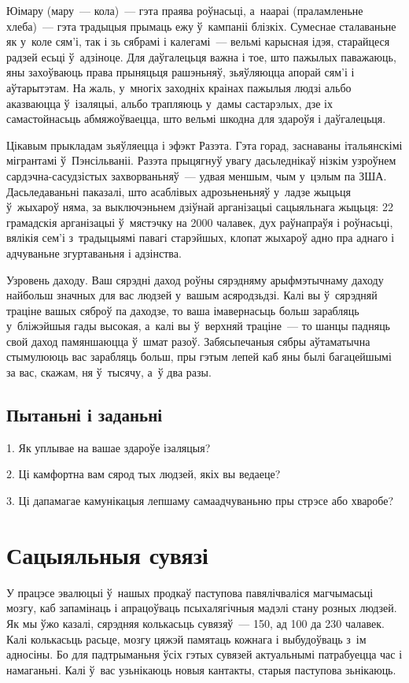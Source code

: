 Юімару (мару~--- кола)~--- гэта праява роўнасьці, а~наараі (праламленьне хлеба)~--- гэта традыцыя прымаць ежу ў~кампаніі блізкіх. Сумеснае сталаваньне як у~коле сям'і, так і зь сябрамі і калегамі~--- вельмі карысная ідэя, старайцеся радзей есьці ў~адзіноце. Для даўгалецьця важна і тое, што пажылых паважаюць, яны захоўваюць права прыняцьця рашэньняў, зьяўляюцца апорай сям'і і аўтарытэтам. На жаль, у~многіх заходніх краінах пажылыя людзі альбо аказваюцца ў~ізаляцыі, альбо трапляюць у~дамы састарэлых, дзе іх самастойнасьць абмяжоўваецца, што вельмі шкодна для здароўя і даўгалецьця.

Цікавым прыкладам зьяўляецца і эфэкт Разэта. Гэта горад, заснаваны італьянскімі мігрантамі ў~Пэнсільваніі. Разэта прыцягнуў увагу дасьледнікаў нізкім узроўнем сардэчна-сасудзістых захворваньняў~--- удвая меншым, чым у~цэлым па ЗША. Дасьледаваньні паказалі, што асаблівых адрозьненьняў у~ладзе жыцьця ў~жыхароў няма, за выключэньнем дзіўнай арганізацыі сацыяльнага жыцьця: 22 грамадскія арганізацыі ў~мястэчку на 2000 чалавек, дух раўнапраўя і роўнасьці, вялікія сем'і з~традыцыямі павагі старэйшых, клопат жыхароў адно пра аднаго і адчуваньне згуртаваньня і адзінства.

Узровень даходу. Ваш сярэдні даход роўны сярэдняму арыфмэтычнаму даходу найбольш значных для вас людзей у~вашым асяродзьдзі. Калі вы ў~сярэдняй траціне вашых сяброў па даходзе, то ваша імавернасьць больш зарабляць у~бліжэйшыя гады высокая, а~калі вы ў~верхняй траціне~--- то шанцы падняць свой даход памяншаюцца ў~шмат разоў. Забясьпечаныя сябры аўтаматычна стымулююць вас зарабляць больш, пры гэтым лепей каб яны былі багацейшымі за вас, скажам, ня ў~тысячу, а~ў два разы.

\subsection*{Пытаньні і заданьні}

1. Як уплывае на вашае здароўе ізаляцыя?

2. Ці камфортна вам сярод тых людзей, якіх вы ведаеце?

3. Ці дапамагае камунікацыя лепшаму самаадчуваньню пры стрэсе або хваробе?


\section{Сацыяльныя сувязі}

У працэсе эвалюцыі ў~нашых продкаў паступова павялічваліся магчымасьці мозгу, каб запамінаць і апрацоўваць псыхалягічныя мадэлі стану розных людзей. Як мы ўжо казалі, сярэдняя колькасьць сувязяў~--- 150, ад 100 да 230 чалавек. Калі колькасьць расьце, мозгу цяжэй памятаць кожнага і выбудоўваць з~ім адносіны. Бо для падтрыманьня ўсіх гэтых сувязей актуальнымі патрабуецца час і намаганьні. Калі ў~вас узьнікаюць новыя кантакты, старыя паступова зьнікаюць.

